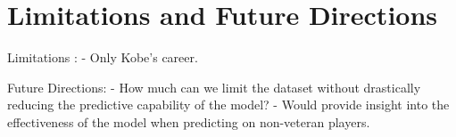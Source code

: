 \chapter{Limitations and Future Directions}\label{chap:discussion}




Limitations :
    - Only Kobe's career.


Future Directions:
    - How much can we limit the dataset without drastically reducing the predictive capability of the model?
        - Would provide insight into the effectiveness of the model when predicting on non-veteran players.